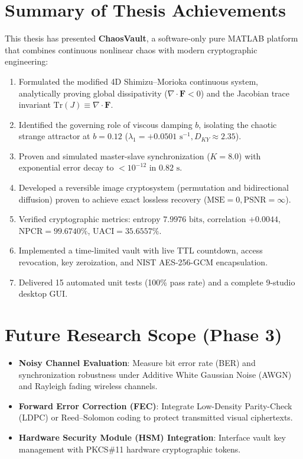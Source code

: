 \documentclass[12pt,a4paper,oneside]{report}
\begin{document}
\section{Summary of Thesis Achievements}
This thesis has presented \textbf{ChaosVault}, a software-only pure MATLAB platform that combines continuous nonlinear chaos with modern cryptographic engineering:
\begin{enumerate}
    \item Formulated the modified 4D Shimizu--Morioka continuous system, analytically proving global dissipativity ($\nabla \cdot \mathbf{F} < 0$) and the Jacobian trace invariant $\text{Tr}(J) \equiv \nabla \cdot \mathbf{F}$.
    \item Identified the governing role of viscous damping $b$, isolating the chaotic strange attractor at $b = 0.12$ ($\lambda_1 = +0.0501\text{ s}^{-1}, D_{KY} \approx 2.35$).
    \item Proven and simulated master-slave synchronization ($K = 8.0$) with exponential error decay to $< 10^{-12}$ in $0.82\text{ s}$.
    \item Developed a reversible image cryptosystem (permutation and bidirectional diffusion) proven to achieve exact lossless recovery ($\text{MSE} = 0, \text{PSNR} = \infty$).
    \item Verified cryptographic metrics: entropy $7.9976\text{ bits}$, correlation $+0.0044$, $\text{NPCR} = 99.6740\%$, $\text{UACI} = 35.6557\%$.
    \item Implemented a time-limited vault with live TTL countdown, access revocation, key zeroization, and NIST AES-256-GCM encapsulation.
    \item Delivered 15 automated unit tests (100\% pass rate) and a complete 9-studio desktop GUI.
\end{enumerate}

\section{Future Research Scope (Phase 3)}
\begin{itemize}
    \item \textbf{Noisy Channel Evaluation}: Measure bit error rate (BER) and synchronization robustness under Additive White Gaussian Noise (AWGN) and Rayleigh fading wireless channels.
    \item \textbf{Forward Error Correction (FEC)}: Integrate Low-Density Parity-Check (LDPC) or Reed--Solomon coding to protect transmitted visual ciphertexts.
    \item \textbf{Hardware Security Module (HSM) Integration}: Interface vault key management with PKCS\#11 hardware cryptographic tokens.
\end{itemize}
\end{document}

